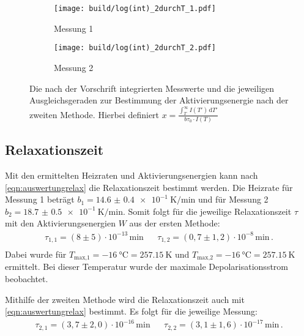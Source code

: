   \begin{figure}[H]
    \begin{subfigure}[b]{.5\linewidth}
      \centering
      \texttt{[image: build/log(int)\_2durchT\_1.pdf]}
      \caption{Messung 1}
    \end{subfigure}
    \begin{subfigure}[b]{.5\linewidth}
      \centering
      \texttt{[image: build/log(int)\_2durchT\_2.pdf]}
      \caption{Messung 2}
    \end{subfigure}
    \caption{Die nach der Vorschrift integrierten Messwerte und die jeweiligen Ausgleichsgeraden zur Bestimmung der Aktivierungsenergie nach der zweiten Methode.
      Hierbei definiert $x = \frac{\int_T^\infty I(T') \, \text{d}T'}{b \tau_0 \cdot I(T)}$}
    \label{fig:Trapez}
  \end{figure} %

\subsection{Relaxationszeit}
  Mit den ermittelten Heizraten und Aktivierungsenergien kann nach \eqref{eqn:auswertungrelax} die Relaxationszeit bestimmt werden.
  Die Heizrate für Messung 1 beträgt $b_1 = \SI{14.6(04)e-1}{\kelvin\per\minute}$ und für Messung 2 $b_2 = \SI{18.7(05)e-1}{\kelvin\per\minute}$.
  Somit folgt für die jeweilige Relaxationszeit $\tau$ mit den Aktivierungsenergien $W$ aus der ersten Methode:
  \begin{align*}
    \tau_{1,1} = (8\pm 5)\cdot 10^{-13}\,\si{\minute} &&  \tau_{1,2} = (0,7\pm 1,2)\cdot 10^{-8}\,\si{\minute} \, . \\ %
  \end{align*}
  Dabei wurde für $T_\text{max,1} = \SI{-16}{\celsius} = \SI{257.15}{\kelvin} $ und $T_\text{max,2} = \SI{-16}{\celsius} = \SI{257.15}{\kelvin}$ ermittelt. %
  Bei dieser Temperatur wurde der maximale Depolarisationsstrom beobachtet.

  \noindent
  Mithilfe der zweiten Methode wird die Relaxationszeit auch mit \eqref{eqn:auswertungrelax} bestimmt.
  Es folgt für die jeweilige Messung:
  \begin{align*}
    \tau_{2,1} =  (3,7\pm 2,0)\cdot 10^{-16}\,\si{\minute} &&  \tau_{2,2} = (3,1\pm 1,6)\cdot 10^{-17}\,\si{\minute}\, . \\ %
  \end{align*}




